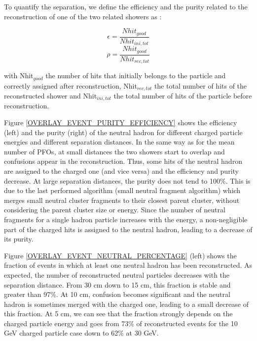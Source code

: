 \documentclass[cits]{JINST}
\begin{document}
To quantify the separation, we define the efficiency and the purity related to the reconstruction of one of the two related showers as :

\begin{equation}
  \epsilon = \frac{Nhit_{good}}{Nhit_{ini,tot}}
\end{equation}
\begin{equation}
  \rho = \frac{Nhit_{good}}{Nhit_{rec,tot}}
\end{equation}

with Nhit$_{good}$ the number of hits that initially belongs to the particle and correctly assigned after reconstruction, Nhit$_{rec,tot}$ the total number of hits of the reconstructed shower and Nhit$_{ini,tot}$ the total number of hits of the particle before reconstruction. 

Figure \ref{OVERLAY_EVENT_PURITY_EFFICIENCY} shows the efficiency (left) and the purity (right) of the neutral hadron for different charged particle energies and different separation distances. In the same way as for the mean number of PFOs, at small distances the two showers start to overlap and confusions appear in the reconstruction. Thus, some hits of the neutral hadron are assigned to the charged one (and vice versa) and the efficiency and purity decrease. At large separation distances, the purity does not tend to 100\%. This is due to the last performed algorithm (small neutral fragment algorithm) which merges small neutral cluster fragments to their closest parent cluster, without considering the parent cluster size or energy. Since the number of neutral fragments for a single hadron particle increases with the energy, a non-negligible part of the charged hits is assigned to the neutral hadron, leading to a decrease of its purity.

Figure \ref{OVERLAY_EVENT_NEUTRAL_PERCENTAGE} (left) shows the fraction of events in which at least one neutral hadron has been reconstructed. As expected, the number of reconstructed neutral particles decreases with the separation distance. From 30 cm down to 15 cm, this fraction is stable and greater than 97\%. At 10 cm, confusion becomes significant and the neutral hadron is sometimes merged with the charged one, leading to a small decrease of this fraction. At 5 cm, we can see that the fraction strongly depends on the charged particle energy and goes from 73\% of reconstructed events for the 10 GeV charged particle case down to 62\% at 30 GeV.
\end{document}
